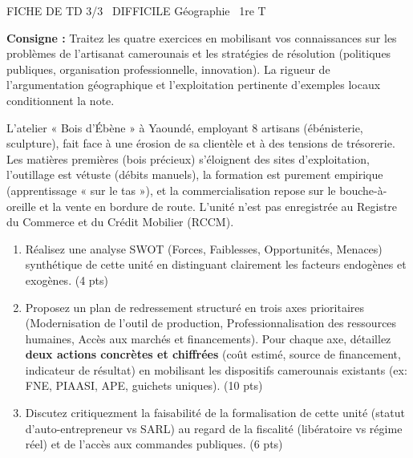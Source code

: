 \documentclass[11pt]{article}
\begin{document}
\begin{tcolorbox}[enhanced,colback=popink,colframe=popink,arc=10pt,boxrule=0pt,left=12pt,right=12pt,top=9pt,bottom=9pt]
{\color{white}\popxbold\small FICHE DE TD 3/3 \textbullet\ DIFFICILE \hfill Géographie \textbullet\ 1re T\par}
\end{tcolorbox}
\vspace{4pt}
\noindent \textbf{Consigne :} Traitez les quatre exercices en mobilisant vos connaissances sur les problèmes de l'artisanat camerounais et les stratégies de résolution (politiques publiques, organisation professionnelle, innovation). La rigueur de l'argumentation géographique et l'exploitation pertinente d'exemples locaux conditionnent la note.

\begin{exercice}
L'atelier « Bois d'Ébène » à Yaoundé, employant 8 artisans (ébénisterie, sculpture), fait face à une érosion de sa clientèle et à des tensions de trésorerie. Les matières premières (bois précieux) s'éloignent des sites d'exploitation, l'outillage est vétuste (débits manuels), la formation est purement empirique (apprentissage « sur le tas »), et la commercialisation repose sur le bouche-à-oreille et la vente en bordure de route. L'unité n'est pas enregistrée au Registre du Commerce et du Crédit Mobilier (RCCM).
\begin{enumerate}
    \item Réalisez une analyse SWOT (Forces, Faiblesses, Opportunités, Menaces) synthétique de cette unité en distinguant clairement les facteurs endogènes et exogènes. (4 pts)
    \item Proposez un plan de redressement structuré en trois axes prioritaires (Modernisation de l'outil de production, Professionnalisation des ressources humaines, Accès aux marchés et financements). Pour chaque axe, détaillez \textbf{deux actions concrètes et chiffrées} (coût estimé, source de financement, indicateur de résultat) en mobilisant les dispositifs camerounais existants (ex: FNE, PIAASI, APE, guichets uniques). (10 pts)
    \item Discutez critiquezment la faisabilité de la formalisation de cette unité (statut d'auto-entrepreneur vs SARL) au regard de la fiscalité (libératoire vs régime réel) et de l'accès aux commandes publiques. (6 pts)
\end{enumerate}
\end{exercice}
\end{document}
